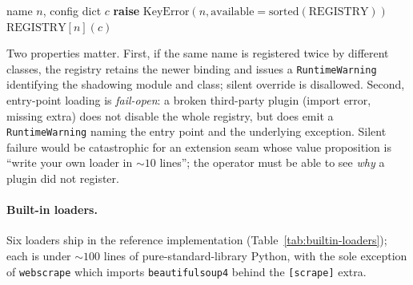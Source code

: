 \begin{algorithm}[h]
\caption{\textsc{get\_loader}$(n, c)$ --- resolve a Loader by name}
\label{alg:get_loader}
\begin{algorithmic}[1]
\Require name $n$, config dict $c$
\State {} 
  \State \textbf{raise} $\mathrm{KeyError}(n, \mathrm{available}=\mathrm{sorted}(\mathrm{REGISTRY}))$
\EndIf
\State \Return $\mathrm{REGISTRY}[n](c)$
\end{algorithmic}
\end{algorithm}

Two properties matter. First, if the same name is registered twice by
different classes, the registry retains the newer binding and issues a
\texttt{RuntimeWarning} identifying the shadowing module and class; silent
override is disallowed. Second, entry-point loading is \emph{fail-open}: a
broken third-party plugin (import error, missing extra) does not disable the
whole registry, but does emit a \texttt{RuntimeWarning} naming the entry point
and the underlying exception. Silent failure would be catastrophic for an
extension seam whose value proposition is ``write your own loader in ${\sim}10$
lines''; the operator must be able to see \emph{why} a plugin did not
register.

\paragraph{Built-in loaders.}
Six loaders ship in the reference implementation
(Table~\ref{tab:builtin-loaders}); each is under $\sim\!100$ lines of
pure-standard-library Python, with the sole exception of
\texttt{webscrape} which imports \texttt{beautifulsoup4} behind the
\texttt{[scrape]} extra.

